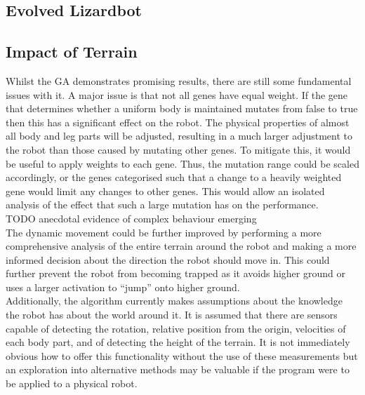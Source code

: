 \documentclass{article}
\begin{document}
\subsection{Evolved Lizardbot}

\subsection{Impact of Terrain}



Whilst the GA demonstrates promising results, there are still some fundamental issues with it. A major issue is that not all genes have equal weight. If the gene that determines whether a uniform body is maintained mutates from false to true then this has a significant effect on the robot. The physical properties of almost all body and leg parts will be adjusted, resulting in a much larger adjustment to the robot than those caused by mutating other genes. To mitigate this, it would be useful to apply weights to each gene. Thus, the mutation range could be scaled accordingly, or the genes categorised such that a change to a heavily weighted gene would limit any changes to other genes. This would allow an isolated analysis of the effect that such a large mutation has on the performance.\\


TODO anecdotal evidence of complex behaviour emerging\\


The dynamic movement could be further improved by performing a more comprehensive analysis of the entire terrain around the robot and making a more informed decision about the direction the robot should move in. This could further prevent the robot from becoming trapped as it avoids higher ground or uses a larger activation to “jump” onto higher ground.\\ Additionally, the algorithm currently makes assumptions about the knowledge the robot has about the world around it. It is assumed that there are sensors capable of detecting the rotation, relative position from the origin, velocities of each body part, and of detecting the height of the terrain. It is not immediately obvious how to offer this functionality without the use of these measurements but an exploration into alternative methods may be valuable if the program were to be applied to a physical robot. \\
\end{document}
